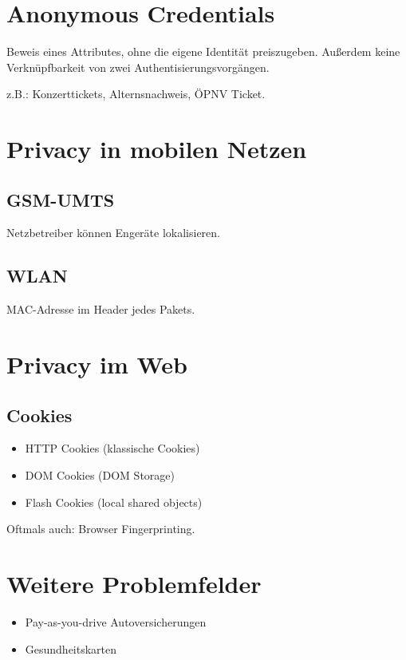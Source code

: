 \section{Anonymous Credentials}
Beweis eines Attributes, ohne die eigene Identität preiszugeben. Außerdem keine Verknüpfbarkeit von zwei Authentisierungsvorgängen.

z.B.: Konzerttickets, Alternsnachweis, ÖPNV Ticket.

\section{Privacy in mobilen Netzen}
\subsection{GSM-UMTS}
Netzbetreiber können Engeräte lokalisieren.

\subsection{WLAN}
MAC-Adresse im Header jedes Pakets.

\section{Privacy im Web}
\subsection{Cookies}
\begin{itemize}
    \item HTTP Cookies (klassische Cookies)
    \item DOM Cookies (DOM Storage)
    \item Flash Cookies (local shared objects)
\end{itemize}
Oftmals auch: Browser Fingerprinting.

\section{Weitere Problemfelder}
\begin{itemize}
    \item Pay-as-you-drive Autoversicherungen
    \item Gesundheitskarten
\end{itemize}
